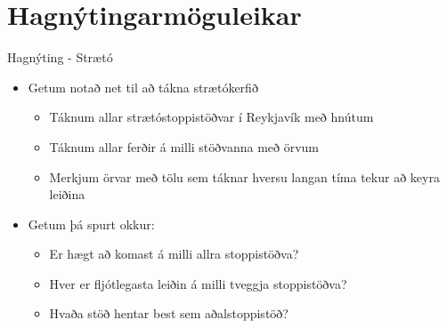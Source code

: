 \documentclass{beamer}
\begin{document}

\section{Hagnýtingarmöguleikar}

\begin{frame}{Hagnýting - Strætó}
\begin{itemize} 
 \item Getum notað net til að tákna strætókerfið
 \begin{itemize}
  \item Táknum allar strætóstoppistöðvar í Reykjavík með hnútum
  \item Táknum allar ferðir á milli stöðvanna með örvum
  \item Merkjum örvar með tölu sem táknar hversu langan tíma tekur að keyra leiðina
 \end{itemize}
 \item Getum þá spurt okkur:
 \begin{itemize}
  \item Er hægt að komast á milli allra stoppistöðva?
  \item Hver er fljótlegasta leiðin á milli tveggja stoppistöðva?
  \item Hvaða stöð hentar best sem aðalstoppistöð?
 \end{itemize}
\end{itemize}
\end{frame}
\end{document}
